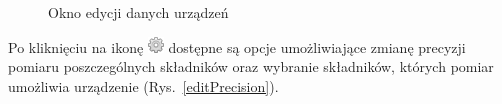 \begin{itemize}
\begin{itemize}
\begin{figure}[!htb]
\centering 		
  \hspace{2mm}
\caption{Okno edycji danych urządzeń} 	
\label{editDevice}
\end{figure}

Po kliknięciu na ikonę \includegraphics[scale=0.75]{images/preferences} dostępne są opcje umożliwiające zmianę precyzji pomiaru poszczególnych składników oraz wybranie składników, których pomiar umożliwia urządzenie (Rys.~\ref{editPrecision}).


\end{itemize}
\end{itemize}
